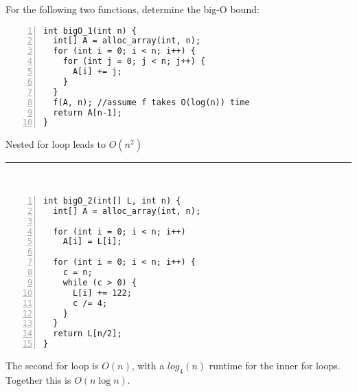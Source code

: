 \enlargethispage{5ex}
\hfill{}
\vspace{-1.5cm}%
\hspace*{-2em}%
\begin{minipage}[b]{0.5\linewidth}
\checkpoint*{}

For the following two functions, determine the big-O bound:

\bigskip\medskip
\begin{lstlisting}[numbers=left, showlines]
int bigO_1(int n) {
  int[] A = alloc_array(int, n);
  for (int i = 0; i < n; i++) {
    for (int j = 0; j < n; j++) {
      A[i] += j;
    }
  }
  f(A, n); //assume f takes O(log(n)) time
  return A[n-1];
}
\end{lstlisting}
\begin{solution}
	Nested for loop leads to $O(n^{2})$
\end{solution}
\end{minipage}%
\hfill\rule[1.5ex]{0.01em}{41ex}~~~~~%
\begin{minipage}[b]{0.39\linewidth}
\begin{lstlisting}[numbers=left]
int bigO_2(int[] L, int n) {
  int[] A = alloc_array(int, n);

  for (int i = 0; i < n; i++)
    A[i] = L[i];

  for (int i = 0; i < n; i++) {
    c = n;
    while (c > 0) {
      L[i] += 122;
      c /= 4;
    }
  }
  return L[n/2];
}
\end{lstlisting}
\begin{solution}
	The second for loop is $O(n)$, with a $log_{4}(n)$ runtime for
        the inner for loops. Together this is $O(n \log n)$.
\end{solution}
\end{minipage}
